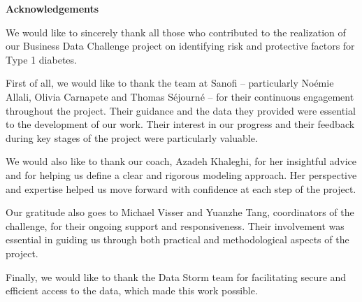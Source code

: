 
\phantom{}
\begin{center}
\textbf{\Large Acknowledgements}
\end{center}
We would like to sincerely thank all those who contributed to the realization of our Business Data Challenge project on identifying risk and protective factors for Type 1 diabetes.

First of all, we would like to thank the team at Sanofi – particularly Noémie Allali, Olivia Carnapete and Thomas Séjourné – for their continuous engagement throughout the project. Their guidance and the data they provided were essential to the development of our work. Their interest in our progress and their feedback during key stages of the project were particularly valuable.

We would also like to thank our coach, Azadeh Khaleghi, for her insightful advice and for helping us define a clear and rigorous modeling approach. Her perspective and expertise helped us move forward with confidence at each step of the project.

Our gratitude also goes to Michael Visser and Yuanzhe Tang, coordinators of the challenge, for their ongoing support and responsiveness. Their involvement was essential in guiding us through both practical and methodological aspects of the project.

Finally, we would like to thank the Data Storm team for facilitating secure and efficient access to the data, which made this work possible.
\newpage
{}
\setcounter{page}{1}
